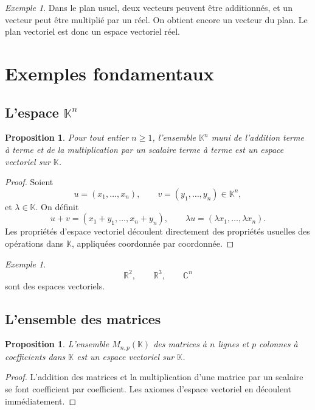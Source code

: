 \documentclass[11pt,a4paper]{article}
\newtheorem{proposition}[definition]{Proposition}
\theoremstyle{remark}
\newtheorem{exemple}[definition]{Exemple}
\newcommand{\R}{\mathbb{R}}
\newcommand{\C}{\mathbb{C}}
\newcommand{\K}{\mathbb{K}}
\begin{document}
\begin{exemple}
Dans le plan usuel, deux vecteurs peuvent être additionnés, et un vecteur peut être multiplié par un réel. On obtient encore un vecteur du plan. Le plan vectoriel est donc un espace vectoriel réel.
\end{exemple}

\section{Exemples fondamentaux}

\subsection{L’espace \(\K^n\)}

\begin{proposition}
Pour tout entier \(n\geq 1\), l’ensemble \(\K^n\) muni de l’addition terme à terme et de la multiplication par un scalaire terme à terme est un espace vectoriel sur \(\K\).
\end{proposition}

\begin{proof}
Soient
\[
u=(x_1,\dots,x_n),\qquad v=(y_1,\dots,y_n)\in \K^n,
\]
et \(\lambda\in\K\). On définit
\[
u+v=(x_1+y_1,\dots,x_n+y_n),
\qquad
\lambda u=(\lambda x_1,\dots,\lambda x_n).
\]
Les propriétés d’espace vectoriel découlent directement des propriétés usuelles des opérations dans \(\K\), appliquées coordonnée par coordonnée.
\end{proof}

\begin{exemple}
\[
\R^2,\qquad \R^3,\qquad \C^n
\]
sont des espaces vectoriels.
\end{exemple}

\subsection{L’ensemble des matrices}

\begin{proposition}
L’ensemble \(M_{n,p}(\K)\) des matrices à \(n\) lignes et \(p\) colonnes à coefficients dans \(\K\) est un espace vectoriel sur \(\K\).
\end{proposition}

\begin{proof}
L’addition des matrices et la multiplication d’une matrice par un scalaire se font coefficient par coefficient. Les axiomes d’espace vectoriel en découlent immédiatement.
\end{proof}
\end{document}
